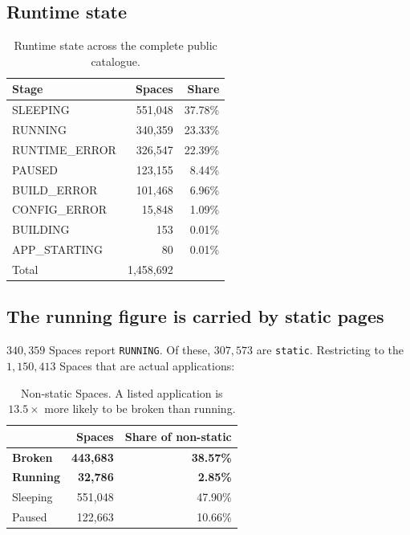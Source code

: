 \documentclass[11pt]{article}
\begin{document}
\subsection{Runtime state}

\begin{table}[h]
\centering
\small
\begin{tabular}{lrr}
\toprule
Stage & Spaces & Share \\
\midrule
SLEEPING & 551{,}048 & 37.78\% \\
RUNNING & 340{,}359 & 23.33\% \\
RUNTIME\_ERROR & 326{,}547 & 22.39\% \\
PAUSED & 123{,}155 & 8.44\% \\
BUILD\_ERROR & 101{,}468 & 6.96\% \\
CONFIG\_ERROR & 15{,}848 & 1.09\% \\
BUILDING & 153 & 0.01\% \\
APP\_STARTING & 80 & 0.01\% \\
\midrule
Total & 1{,}458{,}692 & \\
\bottomrule
\end{tabular}
\caption{Runtime state across the complete public catalogue.}
\label{tab:stage}
\end{table}

\subsection{The running figure is carried by static pages}

$340{,}359$ Spaces report \texttt{RUNNING}. Of these, $307{,}573$ are
\texttt{static}. Restricting to the $1{,}150{,}413$ Spaces that are actual
applications:

\begin{table}[h]
\centering
\small
\begin{tabular}{lrr}
\toprule
& Spaces & Share of non-static \\
\midrule
\textbf{Broken} & \textbf{443{,}683} & \textbf{38.57\%} \\
\textbf{Running} & \textbf{32{,}786} & \textbf{2.85\%} \\
Sleeping & 551{,}048 & 47.90\% \\
Paused & 122{,}663 & 10.66\% \\
\bottomrule
\end{tabular}
\caption{Non-static Spaces. A listed application is $13.5\times$ more likely
to be broken than running.}
\label{tab:nonstatic}
\end{table}
\end{document}
